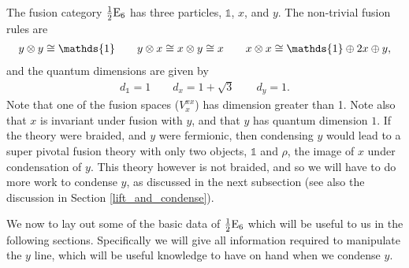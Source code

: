 The fusion category $\frac{1}{2}\text{E}_6$ has three particles, $\mathds{1}$, $x$, and $y$. 
The non-trivial fusion rules are
\begin{align}
y \tp y \cong \mathds{1} \quad \quad y \tp x \cong x \tp y \cong x \quad \quad x\tp x \cong \mathds{1}\oplus 2x \oplus y,
\label{halfEsixFusionRules}
\end{align}
and the quantum dimensions are given by
\begin{align}
d_{\mathds{1}} = 1 \quad \quad d_x = 1 + \sqrt{3} \quad \quad d_y = 1.
\end{align}
Note that one of the fusion spaces ($V_x^{xx}$) has dimension greater than 1.
Note also that $x$ 
is invariant under fusion with $y$, and that $y$ has quantum dimension $1$. 
If the theory were braided, and $y$ were fermionic, then condensing $y$ would lead to a super pivotal 
fusion theory with only two objects, $\mathds{1}$ and $\rho$, the image of $x$ under condensation of $y$. 
This theory however is not braided, and so we will have to do more work to condense $y$, 
as discussed in the next subsection 
(see also the discussion in Section \ref{lift_and_condense}).

\medskip

We now to lay out some of the basic data of $\frac{1}{2}\text{E}_6$ which will be useful to us in the following sections. 
Specifically we will give all information required to manipulate the $y$ line, 
which will be useful knowledge to have on hand when we condense $y$. 

